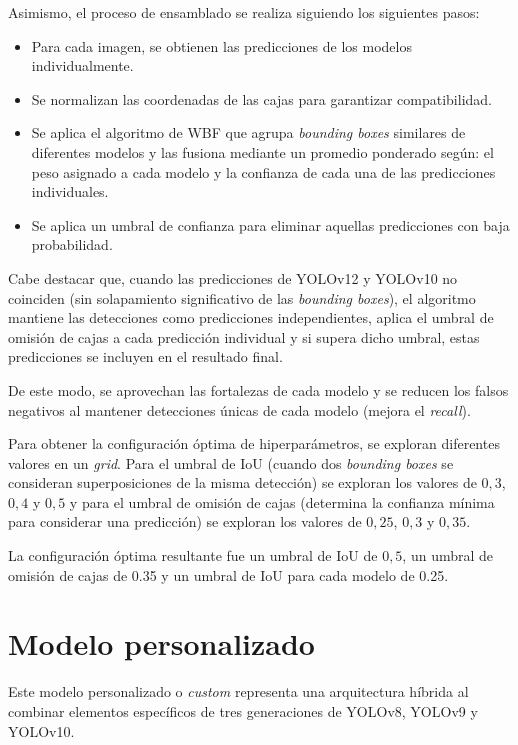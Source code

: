 \documentclass[12pt,a4paper,onecolumn,oneside]{report}
\begin{document}
Asimismo, el proceso de ensamblado se realiza siguiendo los siguientes pasos:

\begin{itemize}
  \item Para cada imagen, se obtienen las predicciones de los modelos individualmente.
  \item Se normalizan las coordenadas de las cajas para garantizar compatibilidad.
  \item Se aplica el algoritmo de WBF que agrupa \textit{bounding boxes} similares de diferentes modelos y las fusiona mediante un promedio ponderado según: el peso asignado a cada modelo y la confianza de cada una de las predicciones individuales.
  \item Se aplica un umbral de confianza para eliminar aquellas predicciones con baja probabilidad.
\end{itemize}

Cabe destacar que, cuando las predicciones de YOLOv12 y YOLOv10 no coinciden (sin solapamiento significativo de las \textit{bounding boxes}), el algoritmo mantiene las detecciones como predicciones independientes,
aplica el umbral de omisión de cajas a cada predicción individual y si supera dicho umbral, estas predicciones se incluyen en el resultado final.

De este modo, se aprovechan las fortalezas de cada modelo y se reducen los falsos negativos al mantener detecciones únicas de cada modelo (mejora el \textit{recall}).

Para obtener la configuración óptima de hiperparámetros, se exploran diferentes valores en un \textit{grid}. Para el umbral de IoU (cuando dos \textit{bounding boxes} se consideran superposiciones de la misma detección) se exploran los valores 
de $0,3$, $0,4$ y $0,5$ y para el umbral de omisión de cajas (determina la confianza mínima para considerar una predicción) se exploran los valores de $0,25$, $0,3$ y $0,35$.

La configuración óptima resultante fue un umbral de IoU de $0,5$, un umbral de omisión de cajas de 0.35 y un umbral de IoU para cada modelo de 0.25.

\section{Modelo personalizado}
\label{Modelo personalizado}

Este modelo personalizado o \textit{custom} representa una arquitectura híbrida al combinar elementos específicos de tres generaciones de YOLOv8, YOLOv9 y YOLOv10. 
\end{document}
